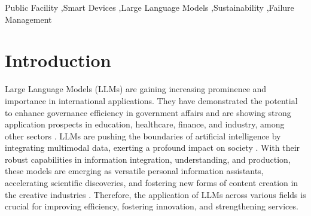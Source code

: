 \documentclass[preprint,12pt]{elsarticle}
\begin{document}
\begin{frontmatter}
%

\begin{keyword}
	Public Facility \sep Smart Devices \sep Large Language Models \sep Sustainability \sep Failure Management 



\end{keyword}

\end{frontmatter}




\section{Introduction}
Large Language Models (LLMs) are gaining increasing prominence and importance in international applications. They have demonstrated the potential to enhance governance efficiency in government affairs and are showing strong application prospects in education, healthcare, finance, and industry, among other sectors \cite{Truong2024658,Mekrache202429,Jin2024,Arora2023641}. LLMs are pushing the boundaries of artificial intelligence by integrating multimodal data, exerting a profound impact on society \cite{Sandmann2024}. With their robust capabilities in information integration, understanding, and production, these models are emerging as versatile personal information assistants, accelerating scientific discoveries, and fostering new forms of content creation in the creative industries \cite{Patsakis2023}. Therefore, the application of LLMs across various fields is crucial for improving efficiency, fostering innovation, and strengthening services.
\end{document}

